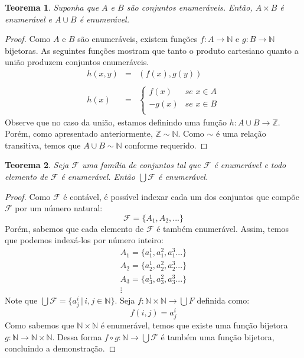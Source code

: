 \documentclass[a4paper]{article}
\newtheorem{Theorem}{Teorema}
\theoremstyle{definition}
\begin{document}
  \begin{Theorem}
    Suponha que $A$ e $B$ são conjuntos enumeráveis. Então, $A\times B$ é
    enumerável e $A \cup B$ é enumerável.
  \end{Theorem}
  \begin{proof}
    Como $A$ e $B$ são enumeráveis, existem funções $f : A \to \mathbb{N}$ e
    $g : B \to \mathbb{N}$ bijetoras. As seguintes funções mostram que tanto o
    produto cartesiano quanto a união produzem conjuntos enumeráveis.
    \[
      \begin{array}{lcl}
        h(x,y) & = & (f(x),g(y))\\ \\
        h(x) & = & \left\{
                   \begin{array}{ll}
                     f(x)  & \textit{se }x\in A\\
                     -g(x) & \textit{se }x \in B\\
                   \end{array}
                   \right.
      \end{array}
    \]
    Observe que no caso da união, estamos definindo uma função $h : A \cup B \to
    \mathbb{Z}$. Porém, como apresentado anteriormente, $\mathbb{Z}\sim
    \mathbb{N}$. Como $\sim$ é uma relação transitiva, temos que $A \cup B \sim
    \mathbb{N}$ conforme requerido.
  \end{proof}

  \begin{Theorem}
    Seja $\mathcal{F}$ uma família de conjuntos tal que $\mathcal{F}$ é
    enumerável e todo elemento de $\mathcal{F}$ é enumerável. Então
    $\bigcup \mathcal{F}$ é enumerável.
  \end{Theorem}
  \begin{proof}
    Como $\mathcal{F}$ é contável, é possível indexar cada um dos conjuntos que
    compõe $\mathcal{F}$ por um número natural:
    \[
      \mathcal{F} =\{A_1,A_2,...\}
    \]
    Porém, sabemos que cada elemento de $\mathcal{F}$ é também enumerável.
    Assim, temos que podemos indexá-los por número inteiro:
    \[
      \begin{array}{l}
        A_1 = \{a^1_1, a^2_1,a^3_1...\}\\
        A_2 = \{a^1_2, a^2_2,a^3_2...\}\\
        A_3 = \{a^1_3, a^2_3,a^3_3...\}\\
        \vdots
      \end{array}
    \]
    Note que $\bigcup\mathcal{F} = \{a^i_j\,|\,i,j\in\mathbb{N}\}$. Seja $f :
    \mathbb{N}\times\mathbb{N} \to \bigcup{F}$ definida como:
    \[
      f(i,j) = a^i_j
    \]
    Como sabemos que $\mathbb{N} \times \mathbb{N}$ é enumerável, temos que
    existe uma função bijetora $g : \mathbb{N} \to \mathbb{N} \times
    \mathbb{N}$. Dessa forma $f \circ g : \mathbb{N} \to \bigcup\mathcal{F}$
    é também uma função bijetora, concluindo a demonstração.
  \end{proof}
\end{document}
